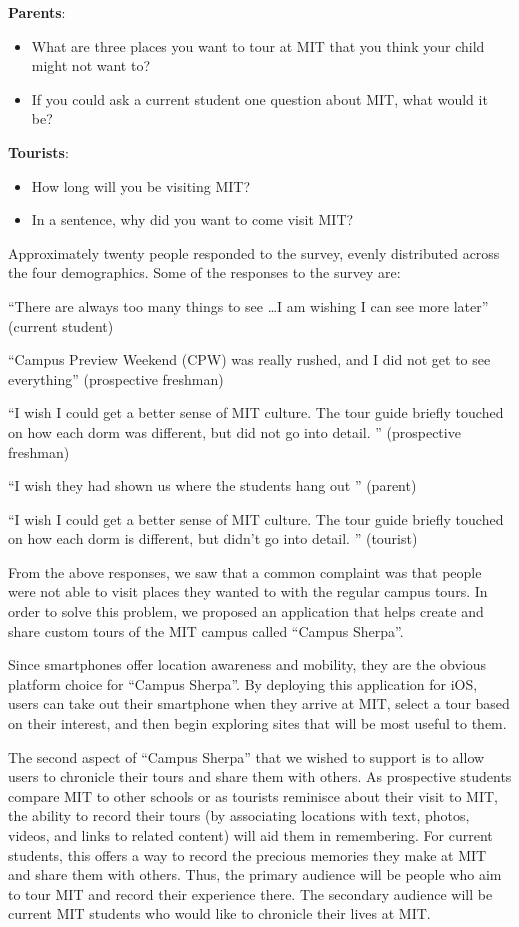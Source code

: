 \documentclass{sigchi}
\begin{document}
\textbf{Parents}:
\begin{itemize}
	\item What are three places you want to tour at MIT that you think your child might not want to?
	\item If you could ask a current student one question about MIT, what would it be?
\end{itemize}

\textbf{Tourists}:
\begin{itemize}
	\item How long will you be visiting MIT?
	\item In a sentence, why did you want to come visit MIT?
\end{itemize}

Approximately twenty people responded to the survey, evenly distributed across the four demographics. Some of the responses to the survey are:

``There are always too many things to see \ldots I am wishing I can see more later'' (current student)

``Campus Preview Weekend (CPW) was really rushed, and I did not get to see everything'' (prospective freshman)

``I wish I could get a better sense of MIT culture. The tour guide briefly touched on how each dorm was different, but did not go into detail. '' (prospective freshman)

``I wish they had shown us where the students hang out '' (parent)

``I wish I could get a better sense of MIT culture. The tour guide briefly touched on how each dorm is different, but didn't go into detail. '' (tourist)

From the above responses, we saw that a common complaint was that people were not able to visit places they wanted to with the regular campus tours. In order to solve this problem, we proposed an application that helps create and share custom tours of the MIT campus called ``Campus Sherpa''.

Since smartphones offer location awareness and mobility, they are the obvious platform choice for ``Campus Sherpa''. By deploying this application for iOS, users can take out their smartphone when they arrive at MIT, select a tour based on their interest, and then begin exploring sites that will be most useful to them.

The second aspect of ``Campus Sherpa'' that we wished to support is to allow users to chronicle their tours and share them with others. As prospective students compare MIT to other schools or as tourists reminisce about their visit to MIT, the ability to record their tours (by associating locations with text, photos, videos, and links to related content) will aid them in remembering. For current students, this offers a way to record the precious memories they make at MIT and share them with others. Thus, the primary audience will be people who aim to tour MIT and record their experience there. The secondary audience will be current MIT students who would like to chronicle their lives at MIT.
\end{document}
